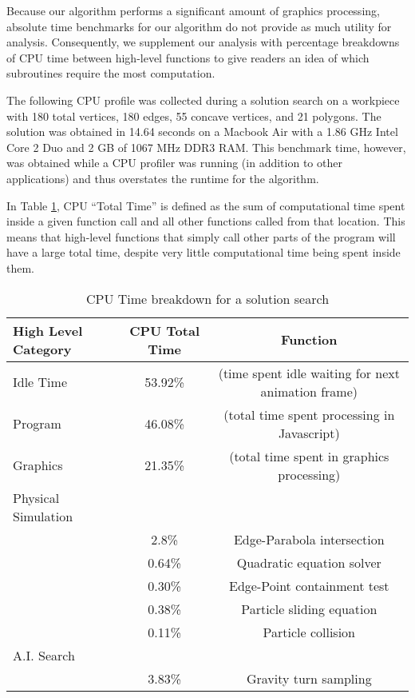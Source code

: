Because our algorithm performs a significant amount of graphics processing, absolute time benchmarks for our algorithm do not provide as much utility for analysis. Consequently, we supplement our analysis with percentage breakdowns of CPU time between high-level functions to give readers an idea of which subroutines require the most computation.

The following CPU profile was collected during a solution search on a workpiece with 180 total vertices, 180 edges, 55 concave vertices, and 21 polygons. The solution was obtained in 14.64 seconds on a Macbook Air with a 1.86 GHz Intel Core 2 Duo and 2 GB of 1067 MHz DDR3 RAM. This benchmark time, however, was obtained while a CPU profiler was running (in addition to other applications) and thus overstates the runtime for the algorithm.

In Table \ref{resultsTable}, CPU ``Total Time'' is defined as the sum of computational time spent inside a given function call and all other functions called from that location. This means that high-level functions that simply call other parts of the program will have a large total time, despite very little computational time being spent inside them.

\begin{table}[H]\label{resultsTable}
\centering
\def\arraystretch{1.2}
\begin{tabular}{|l|c|c|}
\hline
High Level Category & CPU Total Time & Function \\ \hline
Idle Time & 53.92\% & (time spent idle waiting for next animation frame) \\
Program & 46.08\% & (total time spent processing in Javascript) \\
Graphics & 21.35\% &  (total time spent in graphics processing) \\ \hline
Physical Simulation & ~ &  ~ \\ \hline
~ &  2.8\% &  Edge-Parabola intersection \\
~ &  0.64\% & Quadratic equation solver \\
~ &  0.30\% &  Edge-Point containment test \\
~ &  0.38\% & Particle sliding equation \\
~ &  0.11\% & Particle collision \\ \hline
A.I. Search & ~ & ~ \\ \hline
~ &  3.83\% & Gravity turn sampling \\
\hline
\end{tabular}
\caption{CPU Time breakdown for a solution search}
\end{table}

